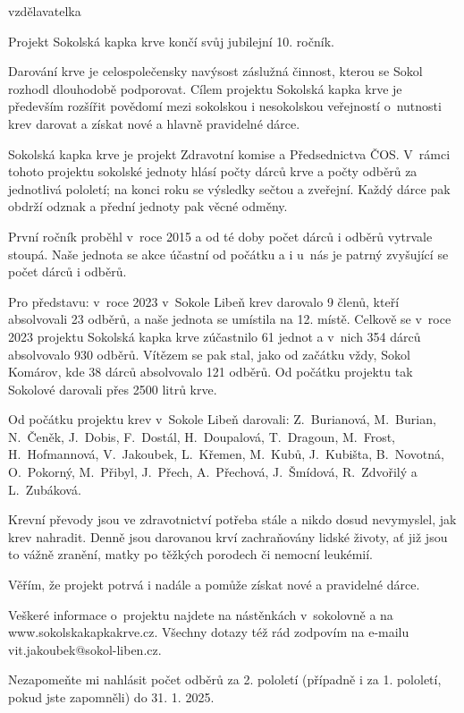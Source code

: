 \documentclass[11pt]{article}
\begin{document}
\signature{Anka Holanová}{vzdělavatelka}

\vspace*{24pt}

Projekt Sokolská kapka krve končí svůj jubilejní 10. ročník. 

Darování krve je celospolečensky navýsost záslužná činnost, kterou se Sokol rozhodl dlouhodobě podporovat. Cílem projektu Sokolská kapka krve je především rozšířit povědomí mezi sokolskou i nesokolskou veřejností o~nutnosti krev darovat a získat nové a hlavně pravidelné dárce. 

Sokolská kapka krve je projekt Zdravotní komise a Předsednictva ČOS. V~rámci tohoto projektu sokolské jednoty hlásí počty dárců krve a počty odběrů za jednotlivá pololetí; na konci roku se výsledky sečtou a zveřejní. Každý dárce pak obdrží odznak a přední jednoty pak věcné odměny. 

První ročník proběhl v~roce 2015 a od té doby počet dárců i odběrů vytrvale stoupá.  Naše jednota se akce účastní od počátku a i u~nás je patrný zvyšující se počet dárců i odběrů. 

Pro představu: v~roce 2023 v~Sokole Libeň krev darovalo 9 členů, kteří absolvovali 23 odběrů, a naše jednota se umístila na 12. místě. Celkově se v~roce 2023 projektu Sokolská kapka krve zúčastnilo 61 jednot a v~nich 354 dárců absolvovalo 930 odběrů. Vítězem se pak stal, jako od začátku vždy, Sokol Komárov, kde 38 dárců absolvovalo 121 odběrů. Od počátku projektu tak Sokolové darovali přes 2500 litrů krve.

Od počátku projektu krev v~Sokole Libeň darovali: 
Z.~Burianová, M.~Burian, N.~Čeněk, J.~Dobis, F.~Dostál, H.~Doupalová, T.~Dragoun, M.~Frost, H.~Hofmannová, V.~Jakoubek, L.~Křemen, M.~Kubů, J.~Kubišta, B.~Novotná, O.~Pokorný, M.~Přibyl, J.~Přech, A.~Přechová, J.~Šmídová, R.~Zdvořilý a L.~Zubáková.

Krevní převody jsou ve zdravotnictví potřeba stále a nikdo dosud nevymyslel, jak krev nahradit. Denně jsou darovanou krví zachraňovány lidské životy, ať již jsou to vážně zranění, matky po těžkých porodech či nemocní leukémií. 

Věřím, že projekt potrvá i nadále a pomůže získat nové a pravidelné dárce.

Veškeré informace o~projektu najdete na nástěnkách v~sokolovně a na www.sokolskakapkakrve.cz. Všechny dotazy též rád zodpovím na e-mailu vit.jakoubek@sokol-liben.cz.

Nezapomeňte mi nahlásit počet odběrů za 2. pololetí (případně i za 1. pololetí, pokud jste zapomněli) do 31. 1. 2025.
\end{document}
